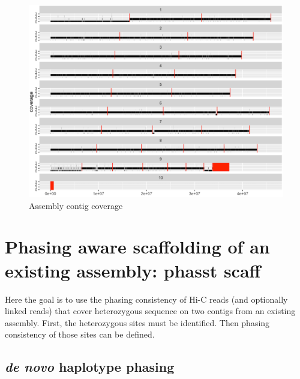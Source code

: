\begin{figure}[htbp!]
\caption{Assembly contig coverage}
\label{figure:contigcoverage}
\begin{centering}
\includegraphics[width=\textwidth]{assemblycontigcoverage.png}
\end{centering}
\end{figure}

\section{Phasing aware scaffolding of an existing assembly: phasst scaff}

\par{
Here the goal is to use the phasing consistency of Hi-C reads (and optionally linked reads) that cover heterozygous sequence on two contigs from an existing assembly. First, the heterozygous sites must be identified. Then phasing consistency of those sites can be defined.
}

\subsection{\textit{de novo} haplotype phasing}

